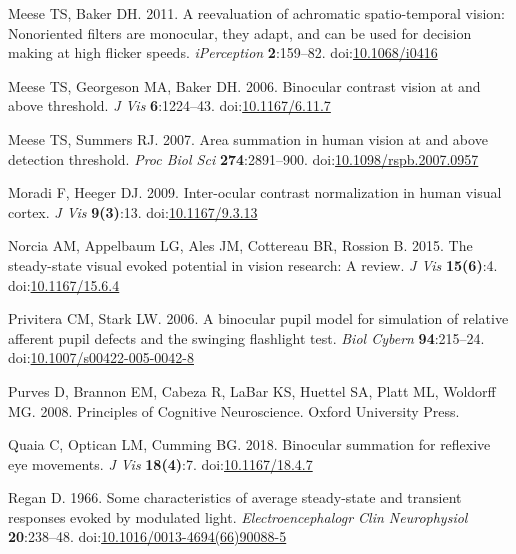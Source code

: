 \documentclass[
]{article}
\begin{document}
\leavevmode\hypertarget{ref-Meese2011}{}%
Meese TS, Baker DH. 2011. A reevaluation of achromatic spatio-temporal vision: Nonoriented filters are monocular, they adapt, and can be used for decision making at high flicker speeds. \emph{iPerception} \textbf{2}:159--82. doi:\href{https://doi.org/10.1068/i0416}{10.1068/i0416}

\leavevmode\hypertarget{ref-Meese2006}{}%
Meese TS, Georgeson MA, Baker DH. 2006. Binocular contrast vision at and above threshold. \emph{J Vis} \textbf{6}:1224--43. doi:\href{https://doi.org/10.1167/6.11.7}{10.1167/6.11.7}

\leavevmode\hypertarget{ref-Meese2007}{}%
Meese TS, Summers RJ. 2007. Area summation in human vision at and above detection threshold. \emph{Proc Biol Sci} \textbf{274}:2891--900. doi:\href{https://doi.org/10.1098/rspb.2007.0957}{10.1098/rspb.2007.0957}

\leavevmode\hypertarget{ref-Moradi2009}{}%
Moradi F, Heeger DJ. 2009. Inter-ocular contrast normalization in human visual cortex. \emph{J Vis} \textbf{9(3)}:13. doi:\href{https://doi.org/10.1167/9.3.13}{10.1167/9.3.13}

\leavevmode\hypertarget{ref-Norcia2015}{}%
Norcia AM, Appelbaum LG, Ales JM, Cottereau BR, Rossion B. 2015. The steady-state visual evoked potential in vision research: A review. \emph{J Vis} \textbf{15(6)}:4. doi:\href{https://doi.org/10.1167/15.6.4}{10.1167/15.6.4}

\leavevmode\hypertarget{ref-Privitera2006}{}%
Privitera CM, Stark LW. 2006. A binocular pupil model for simulation of relative afferent pupil defects and the swinging flashlight test. \emph{Biol Cybern} \textbf{94}:215--24. doi:\href{https://doi.org/10.1007/s00422-005-0042-8}{10.1007/s00422-005-0042-8}

\leavevmode\hypertarget{ref-Purves2008}{}%
Purves D, Brannon EM, Cabeza R, LaBar KS, Huettel SA, Platt ML, Woldorff MG. 2008. Principles of Cognitive Neuroscience. Oxford University Press.

\leavevmode\hypertarget{ref-Quaia2018}{}%
Quaia C, Optican LM, Cumming BG. 2018. Binocular summation for reflexive eye movements. \emph{J Vis} \textbf{18(4)}:7. doi:\href{https://doi.org/10.1167/18.4.7}{10.1167/18.4.7}

\leavevmode\hypertarget{ref-Regan1966}{}%
Regan D. 1966. Some characteristics of average steady-state and transient responses evoked by modulated light. \emph{Electroencephalogr Clin Neurophysiol} \textbf{20}:238--48. doi:\href{https://doi.org/10.1016/0013-4694(66)90088-5}{10.1016/0013-4694(66)90088-5}
\end{document}
